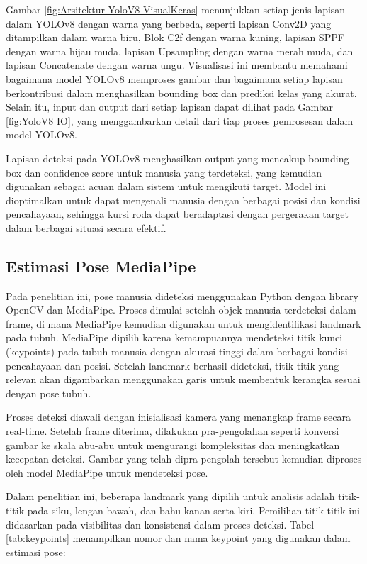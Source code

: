 Gambar \ref{fig:Arsitektur YoloV8 VisualKeras} menunjukkan setiap jenis lapisan dalam YOLOv8 dengan warna yang berbeda, seperti lapisan Conv2D yang ditampilkan dalam warna biru, Blok C2f dengan warna kuning, lapisan SPPF dengan warna hijau muda, lapisan Upsampling dengan warna merah muda, dan lapisan Concatenate dengan warna ungu. Visualisasi ini membantu memahami bagaimana model YOLOv8 memproses gambar dan bagaimana setiap lapisan berkontribusi dalam menghasilkan bounding box dan prediksi kelas yang akurat. Selain itu, input dan output dari setiap lapisan dapat dilihat pada Gambar \ref{fig:YoloV8 IO}, yang menggambarkan detail dari tiap proses pemrosesan dalam model YOLOv8.

Lapisan deteksi pada YOLOv8 menghasilkan output yang mencakup bounding box dan confidence score untuk manusia yang terdeteksi, yang kemudian digunakan sebagai acuan dalam sistem untuk mengikuti target. Model ini dioptimalkan untuk dapat mengenali manusia dengan berbagai posisi dan kondisi pencahayaan, sehingga kursi roda dapat beradaptasi dengan pergerakan target dalam berbagai situasi secara efektif.

\subsection{Estimasi Pose MediaPipe}
\label{subsec:estimasi_pose_mediapipe}

Pada penelitian ini, pose manusia dideteksi menggunakan Python dengan library OpenCV dan MediaPipe. Proses dimulai setelah objek manusia terdeteksi dalam frame, di mana MediaPipe kemudian digunakan untuk mengidentifikasi landmark pada tubuh. MediaPipe dipilih karena kemampuannya mendeteksi titik kunci (keypoints) pada tubuh manusia dengan akurasi tinggi dalam berbagai kondisi pencahayaan dan posisi. Setelah landmark berhasil dideteksi, titik-titik yang relevan akan digambarkan menggunakan garis untuk membentuk kerangka sesuai dengan pose tubuh.

Proses deteksi diawali dengan inisialisasi kamera yang menangkap frame secara real-time. Setelah frame diterima, dilakukan pra-pengolahan seperti konversi gambar ke skala abu-abu untuk mengurangi kompleksitas dan meningkatkan kecepatan deteksi. Gambar yang telah dipra-pengolah tersebut kemudian diproses oleh model MediaPipe untuk mendeteksi pose.

Dalam penelitian ini, beberapa landmark yang dipilih untuk analisis adalah titik-titik pada siku, lengan bawah, dan bahu kanan serta kiri. Pemilihan titik-titik ini didasarkan pada visibilitas dan konsistensi dalam proses deteksi. Tabel \ref{tab:keypoints} menampilkan nomor dan nama keypoint yang digunakan dalam estimasi pose:

